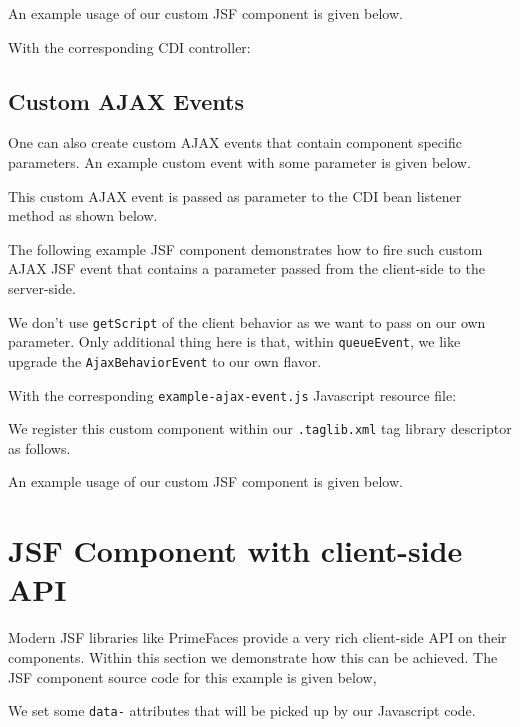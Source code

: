 An example usage of our custom JSF component is given below.


With the corresponding CDI controller:


\subsection{Custom AJAX Events}

One can also create custom AJAX events that contain component specific parameters.
An example custom event with some parameter is given below.


This custom AJAX event is passed as parameter to the CDI bean listener method as shown below.


The following example JSF component demonstrates how to fire such custom AJAX JSF event that contains a parameter passed from the client-side to the server-side.

We don't use \texttt{getScript} of the client behavior as we want to pass on our own parameter.
Only additional thing here is that, within \texttt{queueEvent}, we like upgrade the \texttt{AjaxBehaviorEvent} to our own flavor.

With the corresponding \texttt{example-ajax-event.js} Javascript resource file:


We register this custom component within our \texttt{.taglib.xml} tag library descriptor as follows.


An example usage of our custom JSF component is given below.


\section{JSF Component with client-side API}
Modern JSF libraries like PrimeFaces provide a very rich client-side API on their components.
Within this section we demonstrate how this can be achieved.
The JSF component source code for this example is given below,

We set some \texttt{data-} attributes that will be picked up by our Javascript code.

